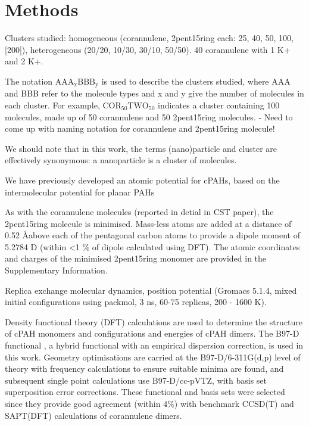 



\section{Methods}
Clusters studied: homogeneous (corannulene, 2pent15ring each: 25, 40, 50, 100, [200]), heterogeneous (20/20, 10/30, 30/10, 50/50).
40 corannulene with 1 K+ and 2 K+.

The notation $\text{AAA}_{\text{x}}\text{BBB}_{\text{y}}$ is used to describe the clusters studied, where AAA and BBB refer to the molecule types and x and y give the number of molecules in each cluster. For example, $\text{COR}_{\text{50}}\text{TWO}_{\text{50}}$ indicates a cluster containing 100 molecules, made up of 50 corannulene and 50 2pent15ring molecules.  
- Need to come up with naming notation for corannulene and 2pent15ring molecule!

We should note that in this work, the terms (nano)particle and cluster are effectively synonymous: a nanoparticle is a cluster of molecules.

We have previously developed an atomic potential for cPAHs, based on the intermolecular potential for planar PAHs 

As with the corannulene molecules (reported in detial in CST paper), the 2pent15ring molecule is minimised. Mass-less atoms are added at a distance of 0.52 \AA above each of the pentagonal carbon atoms to provide a dipole moment of 5.2784 D (within <1 \% of dipole calculated using DFT). The atomic coordinates and charges of the minimised 2pent15ring monomer are provided in the Supplementary Information.

Replica exchange molecular dynamics, position potential (Gromacs 5.1.4, mixed initial configurations using packmol, 3 ns, 60-75 replicas, 200 - 1600 K).

Density functional theory (DFT) calculations are used to determine the structure of cPAH monomers and configurations and energies of cPAH dimers. The B97-D functional \cite{grimme2006semiempirical}, a hybrid functional with an empirical dispersion correction, is used in this work.  Geometry optimisations are carried at the B97-D/6-311G(d,p) level of theory with frequency calculations to ensure suitable minima are found, and subsequent single point calculations use B97-D/cc-pVTZ, with basis set superposition error corrections.  These functional and basis sets were selected since they provide good agreement (within 4\%) with benchmark CCSD(T) \cite{janowski2011convex} and SAPT(DFT) \cite{Cabaleiro-Lago2018} calculations of corannulene dimers. %


